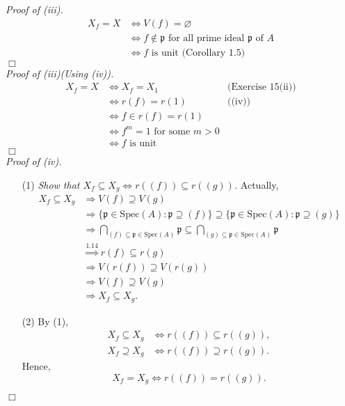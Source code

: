 \documentclass{article}
\begin{document}
\emph{Proof of (iii).}
\begin{align*}
X_f = X
&\Longleftrightarrow V(f) = \varnothing \\
&\Longleftrightarrow f \not\in \mathfrak{p}
\text{ for all prime ideal $\mathfrak{p}$ of $A$} \\
&\Longleftrightarrow f \text{ is unit (Corollary 1.5)}
\end{align*}
$\Box$ \\

\emph{Proof of (iii)(Using (iv)).}
\begin{align*}
X_f = X
&\Longleftrightarrow X_f = X_1
  &\text{(Exercise 15(ii))} \\
&\Longleftrightarrow r(f) = r(1)
  &\text{((iv))} \\
&\Longleftrightarrow f \in r(f) = r(1)
  & \\
&\Longleftrightarrow f^m = 1 \text{ for some $m > 0$}
  & \\
&\Longleftrightarrow f \text{ is unit}
  &
\end{align*}
$\Box$ \\



\emph{Proof of (iv).}
\begin{enumerate}
\item[(1)]
\emph{Show that
$X_f \subseteq X_g \Longleftrightarrow r((f)) \subseteq r((g))$.}
Actually,
\begin{align*}
X_f \subseteq X_g
&\Longrightarrow V(f) \supseteq V(g) \\
&\Longrightarrow \{ \mathfrak{p} \in \mathrm{Spec}(A) : \mathfrak{p} \supseteq (f) \}
  \supseteq \{ \mathfrak{p} \in \mathrm{Spec}(A) : \mathfrak{p} \supseteq (g) \} \\
&\Longrightarrow \bigcap_{(f) \subseteq \mathfrak{p} \in \mathrm{Spec}(A)} \mathfrak{p}
  \subseteq \bigcap_{(g) \subseteq \mathfrak{p} \in \mathrm{Spec}(A)} \mathfrak{p}  \\
&\overset{1.14}{\Longrightarrow} r(f) \subseteq r(g) \\
&\Longrightarrow V(r(f)) \supseteq V(r(g)) \\
&\Longrightarrow V(f) \supseteq V(g) \\
&\Longrightarrow X_f \subseteq X_g.
\end{align*}
\item[(2)]
By (1),
\begin{align*}
X_f \subseteq X_g &\Longleftrightarrow r((f)) \subseteq r((g)), \\
X_f \supseteq X_g &\Longleftrightarrow r((f)) \supseteq r((g)).
\end{align*}
Hence,
$$X_f = X_g \Longleftrightarrow r((f)) = r((g)).$$
\end{enumerate}
$\Box$ \\
\end{document}
